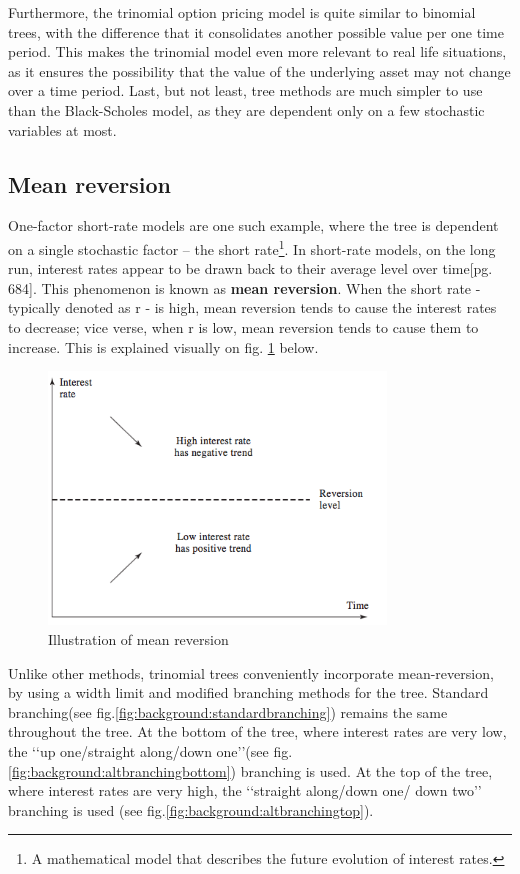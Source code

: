 Furthermore, the trinomial option pricing model is quite similar to binomial trees, with the difference that it consolidates another possible value per one time period. This makes the trinomial model even more relevant to real life situations, as it ensures the possibility that the value of the underlying asset may not change over a time period. Last, but not least, tree methods are much simpler to use than the Black-Scholes model, as they are dependent only on a few stochastic variables at most.

\subsection{Mean reversion}
One-factor short-rate models are one such example, where the tree is dependent on a single stochastic factor – the short rate\footnote{A mathematical model that describes the future evolution of interest rates.}. In short-rate models, on the long run, interest rates appear to be drawn back to their average level over time\cite{ofod}[pg. 684]. This phenomenon is known as \textbf{mean reversion}. When the short rate - typically denoted as r - is high, mean reversion tends to cause the interest rates to decrease; vice verse, when r is low, mean reversion tends to cause them to increase. This is explained visually on fig. \ref{fig:background:meanreversion} below. 

\begin{figure}[H]
	\centering
	\includegraphics[width=0.8\textwidth]{img/meanreversion.png}
	\caption{Illustration of mean reversion}
	\label{fig:background:meanreversion}
\end{figure}

Unlike other methods, trinomial trees conveniently incorporate mean-reversion, by using a width limit and modified branching methods for the tree. Standard branching(see fig.\ref{fig:background:standardbranching}) remains the same throughout the tree. At the bottom of the tree, where interest rates are very low, the ‘‘up one/straight along/down one’’(see fig.\ref{fig:background:altbranchingbottom}) branching is used. At the top of the tree, where interest rates are very high, the ‘‘straight along/down one/ down two’’ branching is used (see fig.\ref{fig:background:altbranchingtop}). 

